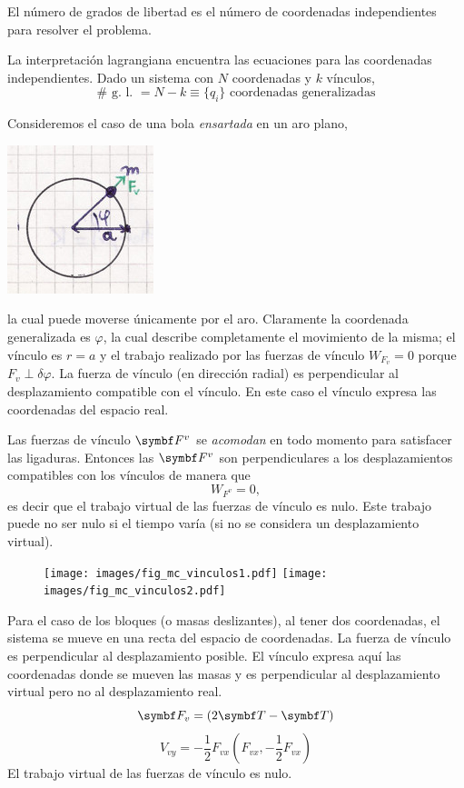 \documentclass[10pt,oneside]{CBFT_book}
\begin{document}
El número de grados de libertad es el número de coordenadas independientes para resolver el problema.

La interpretación lagrangiana encuentra las ecuaciones para las coordenadas independientes.
Dado un sistema con $N$ coordenadas y $k$ vínculos,
\[
	\# \text{ g. l. } = N - k \equiv \{ q_i \} \text{ coordenadas generalizadas}
\]

Consideremos el caso de una bola {\it ensartada} en un aro plano,

\includegraphics[scale=0.35]{images/fig_mc_bola_ensartada.jpg}

la cual puede moverse únicamente por el aro. Claramente la coordenada generalizada es $\varphi$, la cual
describe completamente el movimiento de la misma; el vínculo es $ r = a $ y el trabajo realizado por las
fuerzas de vínculo $W_{F_v} = 0 $ porque $F_v \perp \delta \varphi$. La fuerza de vínculo (en dirección radial)
es perpendicular al desplazamiento compatible con el vínculo.
En este caso el vínculo expresa las coordenadas del espacio real.

Las fuerzas de vínculo $\vb{F}^v$ se {\it acomodan} en todo momento para satisfacer las ligaduras.
Entonces las $\vb{F}^v$ son perpendiculares a los desplazamientos compatibles con los vínculos de
manera que 
\[
	W_{F^v} = 0,
\]
es decir que el trabajo virtual de las fuerzas de vínculo es nulo. Este trabajo puede no ser nulo si el tiempo 
varía (si no se considera un desplazamiento virtual).

\begin{figure}[hbt]
	\begin{center}
	\texttt{[image: images/fig\_mc\_vinculos1.pdf]}	 
	\texttt{[image: images/fig\_mc\_vinculos2.pdf]}
	\end{center}
	\caption{}
\end{figure} 


Para el caso de los bloques (o masas deslizantes), al tener dos coordenadas, el sistema se mueve en una recta del espacio de coordenadas.
La fuerza de vínculo es perpendicular al desplazamiento posible.
El vínculo expresa aquí las coordenadas donde se mueven las masas y es perpendicular al desplazamiento virtual pero no al desplazamiento real.
\[
	\vb{F}_v = (2\vb{T}-\vb{T})
\]
\[
	V_{vy} = - \frac 1 2 F_{vx} (F_{vx},-\frac 1 2 F_{vx})
\]
El trabajo virtual de las fuerzas de vínculo es nulo.
\end{document}
